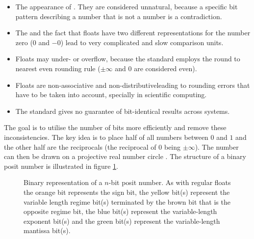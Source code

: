 \documentclass{article}
\theoremstyle{plain} %
\theoremstyle{remark} %
\numberwithin{equation}{section}
\begin{document}
\begin{itemize}
    \item The appearance of . They are considered unnatural, because a specific bit pattern describing a number that is not a number is a contradiction.
    \item The  and the fact that floats have two different representations for the number zero ($0$ and $-0$) lead to very complicated and slow comparison units.
    \item Floats may under- or overflow, because the standard employs the round to nearest even rounding rule ($\pm \infty$ and $0$ are considered even).
    \item Floats are non-associative and non-distributive\footnotemark leading to rounding errors that have to be taken into account, specially in scientific computing.
    \item The standard gives no guarantee of bit-identical results across systems.
\end{itemize}


The goal is to utilise the number of bits more efficiently and remove these inconsistencies. The key idea is to place half of all numbers between $0$ and $1$ and the other half are the reciprocals (the reciprocal of $0$ being $\pm \infty$). The number can then be drawn on a projective real number circle \cite{gustafson2017}. The structure of a binary posit number is illustrated in figure \ref{fig:posit}.

\begin{figure}[H]
  
  \caption{Binary representation of a $n$-bit posit number. As with regular floats the \textcolor{corange}{orange} bit represents the \textcolor{corange}{sign bit}, the \textcolor{cyellow}{yellow} bit(s) represent the variable length \textcolor{cyellow}{regime bit(s)} terminated by the \textcolor{cbrown}{brown} bit that is the \textcolor{cbrown}{opposite regime bit}, the \textcolor{cblue}{blue} bit(s) represent the variable-length \textcolor{cblue}{exponent bit(s)} and the \textcolor{cgreen}{green} bit(s) represent the variable-length \textcolor{cgreen}{mantissa bit(s)}.}
  \label{fig:posit}
\end{figure}
\end{document}

